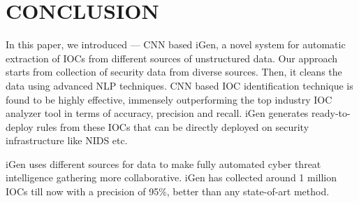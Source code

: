 \chapter{CONCLUSION} \label{chap:conclusion}

In this paper, we introduced --- CNN based iGen, a novel system for automatic extraction of IOCs from different sources of unstructured data. Our approach starts from collection of security data from diverse sources. Then, it cleans the data using advanced NLP techniques. CNN based IOC identification technique is found to be highly effective, immensely outperforming the top industry IOC analyzer tool in terms of accuracy, precision and recall. iGen generates ready-to-deploy rules from these IOCs that can be directly deployed on security infrastructure like NIDS etc.

iGen uses different sources for data to make fully automated cyber threat intelligence gathering more collaborative. iGen has collected around 1 million IOCs till now with a precision of 95\%, better than any state-of-art method. 